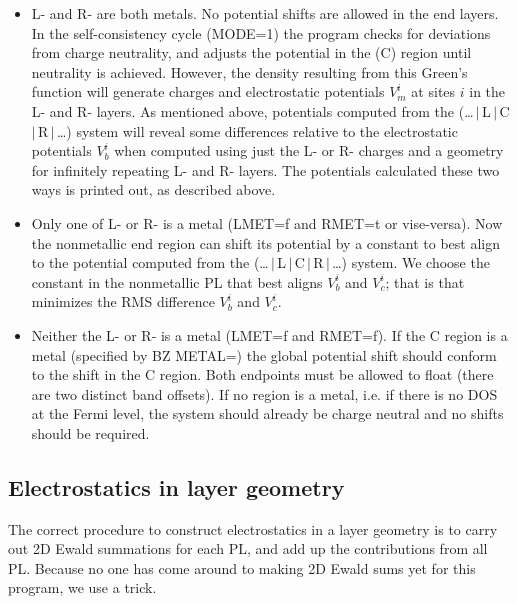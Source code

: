 \documentclass{article}
\begin{document}
\begin{itemize}
\item

 L- and R- are both metals.  No potential shifts are allowed in the end
 layers.  In the self-consistency cycle (MODE=1) the program checks for
 deviations from charge neutrality, and adjusts the potential in the (C)
 region until neutrality is achieved.  However, the density resulting
 from this Green's function will generate charges and electrostatic
 potentials $V^i_m$ at sites $i$ in the L- and R- layers.  As mentioned
 above, potentials computed from the
 (\dots\,$|$\,L\,$|$\,C\,$|$\,R\,$|$\,\dots) system will reveal some
 differences relative to the electrostatic potentials $V^i_b$ when
 computed using just the L- or R- charges and a geometry for infinitely
 repeating L- and R- layers.  The potentials calculated these two ways
 is printed out, as described above.

\item

 Only one of L- or R- is a metal (LMET=f and RMET=t or vise-versa). Now
 the nonmetallic end region can shift its potential by a constant to
 best align to the potential computed from the
 (\dots\,$|$\,L\,$|$\,C\,$|$\,R\,$|$\,\dots) system.  We choose the
 constant in the nonmetallic PL that best aligns $V^i_b$ and $V^i_c$;
 that is that minimizes the RMS difference $V^i_b$ and $V^i_c$.

\item

 Neither the L- or R- is a metal (LMET=f and RMET=f).  If the C region
 is a metal (specified by BZ METAL=) the global potential shift should
 conform to the shift in the C region.  Both endpoints must be allowed
 to float (there are two distinct band offsets).  If no region is a
 metal, i.e. if there is no DOS at the Fermi level, the system should
 already be charge neutral and no shifts should be required.

\end{itemize}

\subsection{Electrostatics in layer geometry}
\label{sec:ewald}

The correct procedure to construct electrostatics in a layer
geometry is to carry out 2D Ewald summations for each PL, and add
up the contributions from all PL.  Because no one has come around
to making 2D Ewald sums yet for this program, we use a trick.
\end{document}
